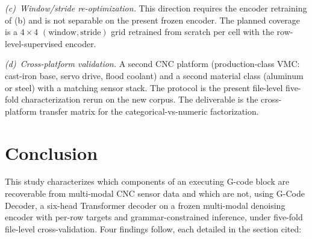 \documentclass[sensors,article,submit,moreauthors,pdftex]{Definitions/mdpi}
\newcommand{\modelname}{G-Code Decoder}
\begin{document}
\emph{(c)~Window/stride re-optimization.} This direction requires the encoder retraining of (b) and is not separable on the present frozen encoder. The planned coverage is a $4\!\times\!4$ $(\text{window}, \text{stride})$ grid retrained from scratch per cell with the row-level-supervised encoder.

\emph{(d)~Cross-platform validation.} A second CNC platform (production-class VMC: cast-iron base, servo drive, flood coolant) and a second material class (aluminum or steel) with a matching sensor stack. The protocol is the present file-level five-fold characterization rerun on the new corpus. The deliverable is the cross-platform transfer matrix for the categorical-vs-numeric factorization.

\section{Conclusion}
\label{sec:conclusion}

This study characterizes which components of an executing G-code block are recoverable from multi-modal CNC sensor data and which are not, using \modelname{}, a six-head Transformer decoder on a frozen multi-modal denoising encoder with per-row targets and grammar-constrained inference, under five-fold file-level cross-validation. Four findings follow, each detailed in the section cited:
\end{document}
